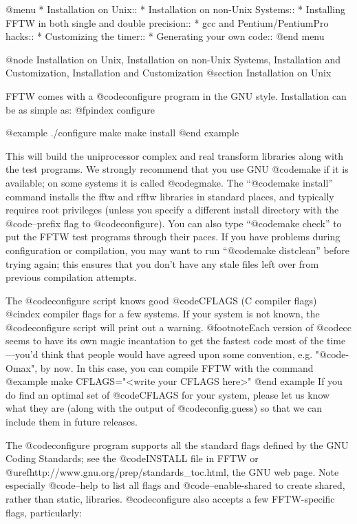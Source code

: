 @menu
* Installation on Unix::        
* Installation on non-Unix Systems::  
* Installing FFTW in both single and double precision::  
* gcc and Pentium/PentiumPro hacks::  
* Customizing the timer::       
* Generating your own code::    
@end menu

@node Installation on Unix, Installation on non-Unix Systems, Installation and Customization, Installation and Customization
@section Installation on Unix

FFTW comes with a @code{configure} program in the GNU style.
Installation can be as simple as:
@fpindex configure

@example
./configure
make
make install
@end example

This will build the uniprocessor complex and real transform libraries
along with the test programs.  We strongly recommend that you use GNU
@code{make} if it is available; on some systems it is called
@code{gmake}.  The ``@code{make install}'' command installs the fftw and
rfftw libraries in standard places, and typically requires root
privileges (unless you specify a different install directory with the
@code{--prefix} flag to @code{configure}).  You can also type
``@code{make check}'' to put the FFTW test programs through their paces.
If you have problems during configuration or compilation, you may want
to run ``@code{make distclean}'' before trying again; this ensures that
you don't have any stale files left over from previous compilation
attempts.

The @code{configure} script knows good @code{CFLAGS} (C compiler flags)
@cindex compiler flags
for a few systems.  If your system is not known, the @code{configure}
script will print out a warning.  @footnote{Each version of @code{cc}
seems to have its own magic incantation to get the fastest code most of
the time---you'd think that people would have agreed upon some
convention, e.g. "@code{-Omax}", by now.}  In this case, you can compile
FFTW with the command
@example
make CFLAGS="<write your CFLAGS here>"
@end example
If you do find an optimal set of @code{CFLAGS} for your system, please
let us know what they are (along with the output of @code{config.guess})
so that we can include them in future releases.

The @code{configure} program supports all the standard flags defined by
the GNU Coding Standards; see the @code{INSTALL} file in FFTW or
@uref{http://www.gnu.org/prep/standards_toc.html, the GNU web page}.
Note especially @code{--help} to list all flags and
@code{--enable-shared} to create shared, rather than static, libraries.
@code{configure} also accepts a few FFTW-specific flags, particularly:

